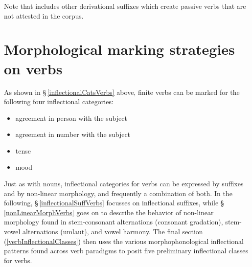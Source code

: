 Note that \citet{Ruong1945} includes other derivational suffixes which create passive verbs that are not attested in the corpus. 

\clearpage

\section{Morphological marking strategies on verbs}\label{markingVerbs}
As shown in §\,\ref{inflectionalCatsVerbs} above, finite verbs can be marked for the following four inflectional categories: 
\begin{itemize}
\item{agreement in person with the subject}
\item{agreement in number with the subject}
\item{tense}
\item{mood}
\end{itemize}
Just as with nouns, inflectional categories for verbs can be expressed by suffixes and by non-linear morphology, and frequently a combination of both. In the following, §\,\ref{inflectionalSuffVerbs} focusses on inflectional suffixes, while §\,\ref{nonLinearMorphVerbs} goes on to describe the behavior of non-linear morphology found in stem-consonant alternations (consonant gradation), stem-vowel alternations (umlaut), %
and vowel harmony. The final section (\ref{verbInflectionalClasses}) then uses the various morphophonological inflectional patterns found across verb paradigms to posit five preliminary inflectional classes for verbs.

\newcommand{\Xp}[1]{\MC{1}{x{80pt}}{#1}}%

